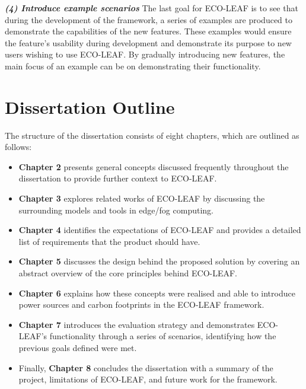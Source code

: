 \documentclass{l4proj}
\begin{document}
\textbf{\textit{(4) Introduce example scenarios}}
The last goal for ECO-LEAF is to see that during the development of the framework, a series of examples are produced to demonstrate the capabilities of the new features.
These examples would ensure the feature's usability during development and demonstrate its purpose to new users wishing to use ECO-LEAF.
By gradually introducing new features, the main focus of an example can be on demonstrating their functionality.

\section{Dissertation Outline}
The structure of the dissertation consists of eight chapters, which are outlined as follows:
\begin{itemize}
    \item \textbf{Chapter 2} presents general concepts discussed frequently throughout the dissertation to provide further context to ECO-LEAF.
    \item \textbf{Chapter 3} explores related works of ECO-LEAF by discussing the surrounding models and tools in edge/fog computing.
    \item \textbf{Chapter 4} identifies the expectations of ECO-LEAF and provides a detailed list of requirements that the product should have.
    \item \textbf{Chapter 5} discusses the design behind the proposed solution by covering an abstract overview of the core principles behind ECO-LEAF.
    \item \textbf{Chapter 6} explains how these concepts were realised and able to introduce power sources and carbon footprints in the ECO-LEAF framework.
    \item \textbf{Chapter 7} introduces the evaluation strategy and demonstrates ECO-LEAF's functionality through a series of scenarios, identifying how the previous goals defined were met.
    \item Finally, \textbf{Chapter 8} concludes the dissertation with a summary of the project, limitations of ECO-LEAF, and future work for the framework.
\end{itemize}
\end{document}
